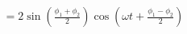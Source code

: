 \documentclass[preview]{standalone}
\begin{document}
\begin{align*}
= 2\sin\left(\frac{\phi_1+\phi_2}{2}\right)\cos\left(\omega t + \frac{\phi_1-\phi_2}{2}\right)
\end{align*}
\end{document}
